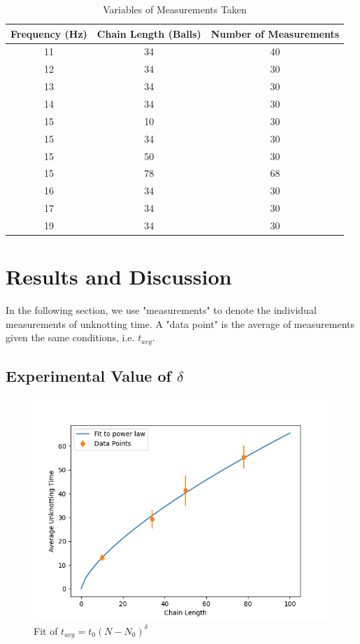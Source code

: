 \documentclass[12pt]{IEEEtran}
\begin{document}
\begin{table}
    \begin{tabular}{|c|c|c|}
        \hline
        Frequency (Hz) & Chain Length (Balls) & Number of Measurements \\
        \hline\hline
        11 & 34 & 40 \\
        \hline
        12 & 34 & 30 \\
        \hline
        13 & 34 & 30 \\
        \hline
        14 & 34 & 30 \\
        \hline
        15 & 10 & 30 \\
        \hline
        15 & 34 & 30 \\
        \hline
        15 & 50 & 30 \\
        \hline
        15 & 78 & 68 \\
        \hline
        16 & 34 & 30 \\
        \hline
        17 & 34 & 30 \\
        \hline
        19 & 34 & 30 \\
        \hline
    \end{tabular}
    \caption{Variables of Measurements Taken}
\end{table}

\section{Results and Discussion}

In the following section, we use "measurements" to denote the individual measurements of unknotting time. A "data point" is the average of measurements given the same conditions, i.e. $t_{avg}$.

\subsection{Experimental Value of $\delta$}

\begin{figure}[h]
    \centering
    \includegraphics[scale=0.5]{part1_plot.png}
    \caption{Fit of $t_{avg} = t_0(N - N_0)^\delta$}
\end{figure}
\end{document}
